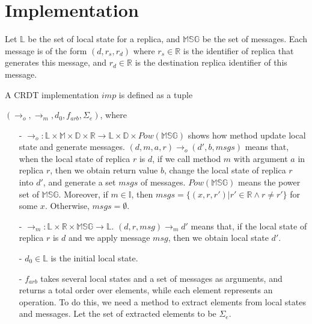 
\section{Implementation}
\label{sec:implementation}

Let $\mathbb{L}$ be the set of local state for a replica, and $\mathbb{MSG}$ be the set of messages. Each message is of the form $(d,r_s,r_d)$ where $r_s \in \mathbb{R}$ is the identifier of replica that generates this message, and $r_d \in \mathbb{R}$ is the destination replica identifier of this message.

A CRDT implementation $imp$ is defined as a tuple {\color {red}$(\rightarrow_o,\rightarrow_m,d_0,f_{\mathit{arb}}, \Sigma_e)$, where

\begin{itemize}
\setlength{\itemsep}{0.5pt}
\item[-] $\rightarrow_o: \mathbb{L} \times \mathbb{M} \times \mathbb{D} \times \mathbb{R} \rightarrow \mathbb{L} \times \mathbb{D} \times Pow(\mathbb{MSG})$ shows how method update local state and generate messages. $(d,m,a,r) \rightarrow_o (d',b,msgs)$ means that, when the local state of replica $r$ is $d$, if we call method $m$ with argument $a$ in replica $r$, then we obtain return value $b$, change the local state of replica $r$ into $d'$, and generate a set $msgs$ of messages. $Pow(\mathbb{MSG})$ means the power set of $\mathbb{MSG}$. Moreover, if $m \in \mathbb{I}$, then $msgs = \{ (x,r,r') \vert r' \in \mathbb{R} \wedge r \neq r' \}$ for some $x$. Otherwise, $msgs = \emptyset$.

\item[-] $\rightarrow_m: \mathbb{L} \times \mathbb{R} \times \mathbb{MSG} \rightarrow \mathbb{L}$. $(d,r,msg) \rightarrow_m d'$ means that, if the local state of replica $r$ is $d$ and we apply message $msg$, then we obtain local state $d'$.

\item[-] $d_0 \in \mathbb{L}$ is the initial local state.

\item[-] $f_{\mathit{arb}}$ takes several local states and a set of messages as arguments, and returns a total order over elements, while each element represents an operation. To do this, we need a method to extract elements from local states and messages. Let the set of extracted elements to be $\Sigma_e$.


\end{itemize}
}

